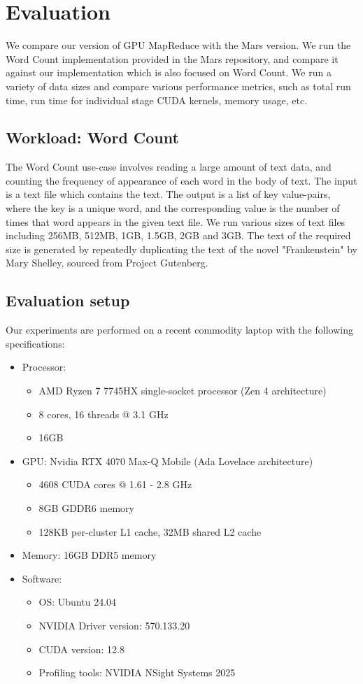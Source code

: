 \documentclass{article}
\begin{document}
\section{Evaluation}
We compare our version of GPU MapReduce with the Mars version. We run the Word Count implementation provided in the Mars repository, and compare it against our implementation which is also focused on Word Count. We run a variety of data sizes and compare various performance metrics, such as total run time, run time for individual stage CUDA kernels, memory usage, etc.

\subsection{Workload: Word Count}
The Word Count use-case involves reading a large amount of text data, and counting the frequency of appearance of each word in the body of text. The input is a text file which contains the text. The output is a list of key value-pairs, where the key is a unique word, and the corresponding value is the number of times that word appears in the given text file. We run various sizes of text files including 256MB, 512MB, 1GB, 1.5GB, 2GB and 3GB. The text of the required size is generated by repeatedly duplicating the text of the novel "Frankenstein" by Mary Shelley, sourced from Project Gutenberg.  

\subsection{Evaluation setup}
Our experiments are performed on a recent commodity laptop with the following specifications:
\begin{itemize}
    \item Processor: 
    \begin{itemize}
       \item AMD Ryzen 7 7745HX single-socket processor (Zen 4 architecture)
       \item 8 cores, 16 threads @ 3.1 GHz
       \item 16GB
    \end{itemize}
    \item GPU: Nvidia RTX 4070 Max-Q Mobile (Ada Lovelace architecture)
    \begin{itemize}
        \item 4608 CUDA cores @ 1.61 - 2.8 GHz
        \item 8GB GDDR6 memory
        \item 128KB per-cluster L1 cache, 32MB shared L2 cache
    \end{itemize}
    \item Memory: 16GB DDR5 memory
    \item Software:
    \begin{itemize}
        \item OS: Ubuntu 24.04
        \item NVIDIA Driver version: 570.133.20
        \item CUDA version: 12.8
        \item Profiling tools: NVIDIA NSight Systems 2025
    \end{itemize}
\end{itemize}
\end{document}
